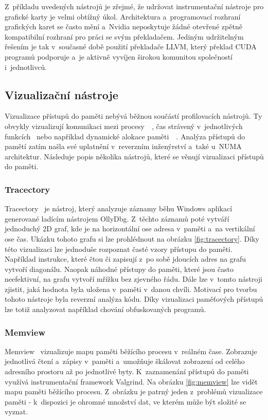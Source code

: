 Z~příkladu uvedených nástrojů je zřejmé, že udržovat instrumentační nástroje pro grafické karty je velmi obtížný úkol. Architektura a~programovací rozhraní grafických karet se často mění a~Nvidia neposkytuje žádné otevřené zpětně kompatibilní rozhraní pro práci se svým překladačem. Jediným udržitelným řešením je tak v~současné době použití překladače LLVM, který překlad CUDA programů podporuje a~je aktivně vyvíjen širokou komunitou společností i~jednotlivců.

\subsection{Vizualizační nástroje}
Vizualizace přístupů do paměti nebývá běžnou součástí profilovacích nástrojů. Ty obvykly vizualizují komunikaci mezi procesy~\cite{tau}~\cite{vampir}, čas strávený v~jednotlivých funkcích~\cite{flamegraph} nebo například dynamické alokace paměti~\cite{gcspy}~\cite{dynmem-visualisation}. Analýza přístupů do pamětí zatím našla své uplatnění v~reverzním inženýrství a~také u~NUMA architektur. Následuje popis několika nástrojů, které se věnují vizualizaci přístupů do paměti.

\subsubsection*{Tracectory}
Tracectory~\cite{tracectory} je nástroj, který analyzuje záznamy běhu Windows aplikací generované ladícím nástrojem OllyDbg. Z~těchto záznamů poté vytváří jednoduchý 2D graf, kde je na horizontální ose adresa v~paměti a~na vertikální ose čas. Ukázku tohoto grafu si lze prohlédnout na obrázku \ref{fig:tracectory}. Díky této vizualizaci lze jednoduše rozpoznat časté vzory přístupu do paměti. Například instrukce, které čtou či zapisují z~po sobě jdoucích adres na grafu vytvoří diagonálu. Naopak náhodné přístupy do paměti, které jsou často neefektivní, na grafu vytvoří mřížku bez zjevného řádu. Dále lze v~tomto nástroji zjistit, jaká hodnota byla uložena v~paměti v~danou chvíli. Motivací pro tvorbu tohoto nástroje byla reverzní analýza kódu. Díky vizualizaci paměťových přístupů lze totiž analyzovat například chování obfuskovaných programů.

\subsubsection*{Memview}
Memview~\cite{memview} vizualizuje mapu paměti běžícího procesu v~reálném čase. Zobrazuje jednotlivá čtení a~zápisy v~paměti a~umožňuje škálovat zobrazení od celého adresního prostoru až po jednotlivé byty. K~zaznamenání přístupů do paměti využívá instrumentační framework Valgrind. Na obrázku \ref{fig:memview} lze vidět mapu paměti běžícího procesu. Z~obrázku je patrný jeden z~problémů vizualizace paměti - k~dispozici je ohromné množství dat, ve kterém může být složité se vyznat.

